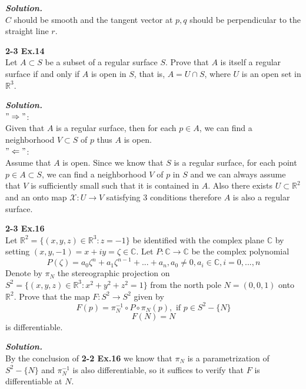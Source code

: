 \documentclass{article}
\begin{document}
\par
\textbf{\textit{Solution.}}\\
$C$ should be smooth and the tangent vector at $p,q$ should be perpendicular to the straight line $r$.

\par
\textbf{2-3 Ex.14}\\
Let $A \subset S$ be a subset of a regular surface $S$. Prove that $A$ is itself a regular surface if and only if $A$ is open
in $S$, that is, $A = U \cap S$, where $U$ is an open set in $\mathbb{R}^3$.

\par
\textbf{\textit{Solution.}}\\
$"\Rightarrow"$:\\
Given that $A$ is a regular surface, then for each $p \in A$, we can find a neighborhood $V \subset S$ of $p$ thus $A$ is open.\\
$"\Leftarrow"$:\\
Assume that $A$ is open. Since we know that $S$ is a regular surface, for each point $p \in A \subset S$, we can find a neighborhood $V$
of $p$ in $S$ and we can always assume that $V$ is sufficiently small such that it is contained in $A$. Also there exists $U \subset \mathbb{R}^2$
and an onto map $\mathcal{X}: U \to V$ satisfying 3 conditions therefore $A$ is also a regular surface. \qedsymbol

\par
\textbf{2-3 Ex.16}\\
Let $\mathbb{R}^2 = \{(x,y,z) \in \mathbb{R}^3: z = -1\}$ be identified with the complex plane $\mathbb{C}$ by setting $(x,y,-1)=x+iy=\zeta \in \mathbb{C}$.
Let $P: \mathbb{C} \to \mathbb{C}$ be the complex polynomial
$$
    P(\zeta) = a_0 \zeta^n + a_1 \zeta^{n-1} + ... + a_n, a_0 \neq 0, a_i \in \mathbb{C}, i=0,...,n
$$
Denote by $\pi_N$ the stereographic projection on $S^2 = \{(x,y,z) \in \mathbb{R}^3: x^2+y^2+z^2=1\}$ from the north pole $N=(0,0,1)$
onto $\mathbb{R}^2$. Prove that the map $F: S^2 \to S^2$ given by
$$
    F(p) = \pi_N^{-1} \circ P \circ \pi_N(p), \text{ if } p \in S^2 - \{N\}
$$
$$
    F(N) = N
$$
is differentiable.

\par
\textbf{\textit{Solution.}}\\
By the conclusion of \textbf{2-2 Ex.16} we know that $\pi_N$ is a parametrization of $S^2 - \{N\}$ and $\pi_N^{-1}$ is also differentiable, so it suffices to 
verify that $F$ is differentiable at $N$.
\end{document}
